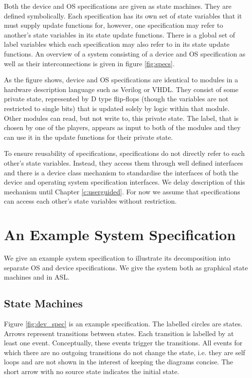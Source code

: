 Both the device and OS specifications are given as state machines. They are defined symbolically. Each specification has its own set of state variables that it must supply update functions for, however, one specification may refer to another's state variables in its state update functions. There is a global set of label variables which each specification may also refer to in its state update functions. An overview of a system consisting of a device and OS specification as well as their interconnections is given in figure \ref{fig:specs}.

As the figure shows, device and OS specifications are identical to modules in a hardware description language such as Verilog or VHDL. They consist of some private state, represented by D type flip-flops (though the variables are not restricted to single bits) that is updated solely by logic within that module. Other modules can read, but not write to, this private state. The label, that is chosen by one of the players, appears as input to both of the modules and they can use it in the update functions for their private state.

To ensure reusability of specifications, specifications do not directly refer to each other's state variables. Instead, they access them through well defined interfaces and there is a device class mechanism to standardise the interfaces of both the device and operating system specification interfaces. We delay description of this mechanism until Chapter \ref{c:userguided}. For now we assume that specifications can access each other's state variables without restriction.

\section{An Example System Specification}

We give an example system specification to illustrate its decomposition into separate OS and device specifications. We give the system both as graphical state machines and in ASL.

\subsection{State Machines}

Figure \ref{fig:dev_spec} is an example specification. The labelled circles are states. Arrows represent transitions between states. Each transition is labelled by at least one event. Conceptually, these events trigger the transitions. All events for which there are no outgoing transitions do not change the state, i.e. they are self loops and are not shown in the interest of keeping the diagrams concise. The short arrow with no source state indicates the initial state.

